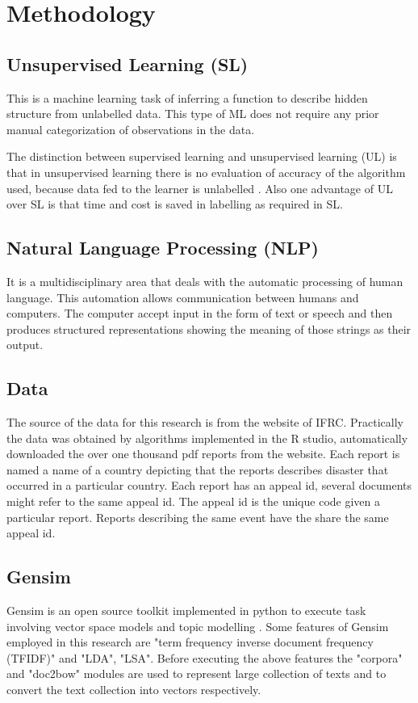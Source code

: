 \chapter{Methodology}
\section{Unsupervised Learning (SL)}
This is a machine learning task of inferring a function to describe hidden structure from unlabelled data. This type of ML does not require any prior manual categorization of observations in the data. 

The distinction between supervised learning and unsupervised learning (UL) is that in unsupervised learning there is no evaluation of accuracy of the algorithm used, because data fed to the learner is unlabelled . Also one advantage of UL over SL is that time and cost is saved in labelling as required in SL. 
\section{Natural Language Processing (NLP)}
It is a multidisciplinary area that deals with the automatic processing of human language. 
This automation allows communication between humans and computers. The computer accept input in the form of text or speech and then produces structured representations showing the meaning of those strings as their output.
\section{Data}
The source of the data for this research is from the website of IFRC. Practically the data was obtained by algorithms implemented in the R studio, automatically downloaded the over one thousand pdf reports from the website. Each report is named a name of a country depicting that the reports describes disaster that occurred in a particular country. Each report has an appeal id, several documents might refer to the same appeal id. The appeal id is the unique code given a particular report. Reports describing the same event have the share the same appeal id.
\section{Gensim}
Gensim is an open source toolkit implemented in python to execute task involving vector space models and topic modelling \cite{rehurek2010software}. Some features of Gensim employed in this research are "term frequency inverse document frequency (TFIDF)" and "LDA", "LSA". Before executing the above features the "corpora" and "doc2bow" modules are used to represent large collection of texts and to convert the text collection into vectors respectively.
